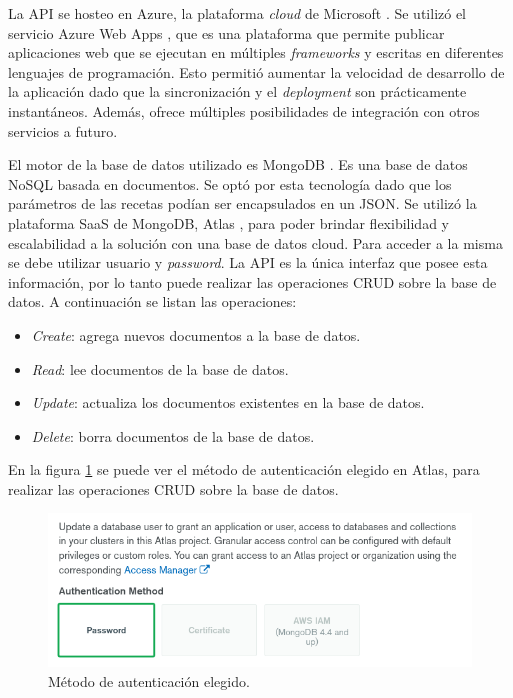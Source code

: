 La API se hosteo en Azure, la plataforma \textit{cloud} de Microsoft \citep{Azure}. Se utilizó el servicio Azure Web Apps \citep{WebApps}, que es una plataforma que permite publicar aplicaciones web que se ejecutan en múltiples \textit{frameworks} y escritas en diferentes lenguajes de programación. Esto permitió aumentar la velocidad de desarrollo de la aplicación dado que la sincronización y el \textit{deployment} son prácticamente instantáneos. Además, ofrece múltiples posibilidades de integración con otros servicios a futuro.

El motor de la base de datos utilizado es MongoDB \citep{mongo}. Es una base de datos NoSQL basada en documentos. Se optó por esta tecnología dado que los parámetros de las recetas podían ser encapsulados en un JSON. Se utilizó la plataforma SaaS de MongoDB, Atlas \citep{atlas}, para poder brindar flexibilidad y escalabilidad a la solución con una base de datos cloud. Para acceder a la misma se debe utilizar usuario y \textit{password}. La API es la única interfaz que posee esta información, por lo tanto puede realizar las operaciones CRUD \citep{CRUD} sobre la base de datos. A continuación se listan las operaciones:

\begin{itemize}
\item \textit{Create}: agrega nuevos documentos a la base de datos.
\item \textit{Read}: lee documentos de la base de datos.
\item \textit{Update}: actualiza los documentos existentes en la base de datos.
\item \textit{Delete}: borra documentos de la base de datos.
\end{itemize}

En la figura \ref{fig:dbpass} se puede ver el método de autenticación elegido en Atlas, para realizar las operaciones CRUD sobre la base de datos.

\begin{figure}[htpb]
	\centering
	\includegraphics[scale=.5]{./Figures/dbpass.png}
	\caption{Método de autenticación elegido\protect\footnotemark.}
	\label{fig:dbpass}
\end{figure}

